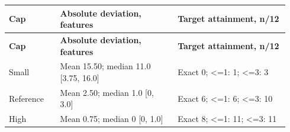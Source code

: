 {
\small
\renewcommand{\arraystretch}{1.08}
\setlength{\tabcolsep}{2.2pt}
\renewcommand{\theHtable}{suppanel.31}%
\begin{longtable}{@{}>{\raggedright\arraybackslash}p{0.1747\linewidth}>{\raggedright\arraybackslash}p{0.3917\linewidth}>{\raggedright\arraybackslash}p{0.3736\linewidth}@{}}
\toprule
\bfseries Cap & \bfseries Absolute deviation, features & \bfseries Target attainment, n/12 \\
\midrule
\endfirsthead
\toprule
\bfseries Cap & \bfseries Absolute deviation, features & \bfseries Target attainment, n/12 \\
\midrule
\endhead
\bottomrule
\endfoot
Small & Mean 15.50; median 11.0 [3.75, 16.0] & Exact 0; <=1: 1; <=3: 3 \\
Reference & Mean 2.50; median 1.0 [0, 3.0] & Exact 6; <=1: 6; <=3: 10 \\
High & Mean 0.75; median 0 [0, 1.0] & Exact 8; <=1: 11; <=3: 11 \\
\end{longtable}
\addtocounter{table}{-1}%
}
